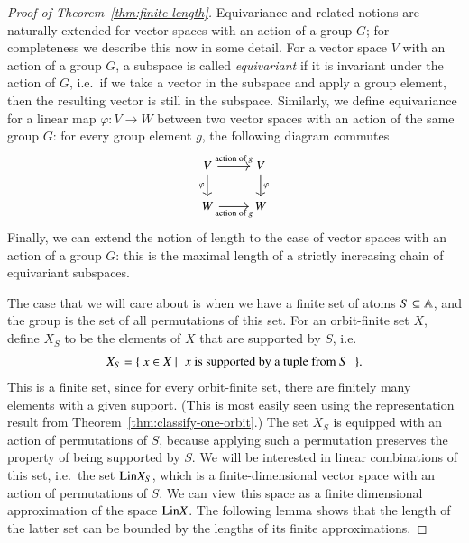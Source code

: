 \begin{proof}[Proof of Theorem~\ref{thm:finite-length}]
    Equivariance and related notions are naturally extended for vector spaces with an action of a group $G$; for completeness we describe this now in some detail. 
    For a vector space $V$ with an action of a group $G$, a subspace is called \emph{equivariant} if it is invariant under the action of $G$, i.e.~if we take a vector in the subspace and apply a group element, then the resulting vector is still in the subspace. Similarly, we define equivariance for a linear map $\varphi : V \to W$ between two vector spaces with an action of the same group $G$: for every group element $g$, the following diagram commutes 
    \[
    \begin{tikzcd}
V 
\ar[d, "\varphi"']
\ar[r, "\text{action of $g$}"]
& V 
\ar[d, "\varphi"] \\
W
\ar[r, "\text{action of $g$}"']
& W
    \end{tikzcd}
    \]
    Finally, we can extend the notion of length to the case of vector spaces with an action of a group $G$:  this is the maximal length of a strictly increasing chain of equivariant subspaces. 

    The case that we will care about is when we have a finite set of atoms $S \subseteq \mathbb A$, and the group is the set of all permutations of this set. For an orbit-finite set $X$, define $X_S$ to be the elements of $X$ that are supported by $S$, i.e.
    \begin{align*}
    X_S = 
    \setbuild{ x \in X}{$x$ is supported by a tuple from $S$}.
    \end{align*}
    This is a finite set, since for every orbit-finite set, there are finitely many elements with a given support. (This is most easily seen using the representation result from Theorem~\ref{thm:classify-one-orbit}.) 
    The set $X_S$ is equipped with an action of permutations of $S$, because applying such a permutation preserves the property of being supported by $S$. We will be interested in linear combinations of this set, i.e.~the set $\mathrm{Lin} X_S$, which is a finite-dimensional vector space with an action of permutations of $S$. We can view this space as a finite dimensional approximation of the   space $\mathrm{Lin} X$.  The following lemma shows that the length of the latter  set can be bounded by the lengths of its finite approximations. 


\end{proof}

